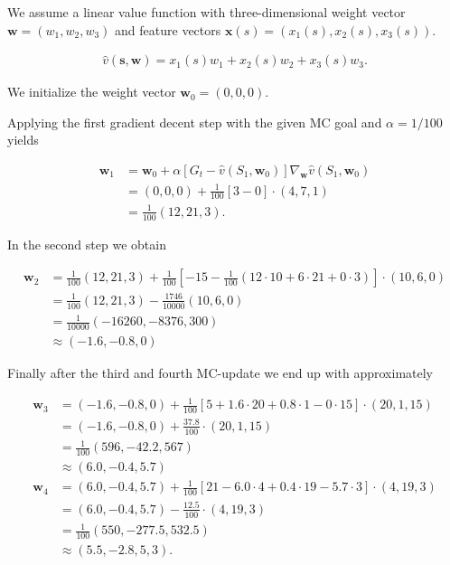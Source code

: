 \begin{solution}

We assume a linear value function with three-dimensional weight vector $\textbf{w} = (w_1,w_2,w_3)$
and feature vectors $\textbf{x}(s) = (x_1(s), x_2(s), x_3(s))$.

\begin{align*}
    \hat{v}(\textbf{s}, \textbf{w}) = x_1(s)w_1 + x_2(s)w_2 + x_3(s)w_3.
\end{align*}

We initialize the weight vector $\textbf{w}_0 = (0,0,0)$.

Applying the first gradient decent step with the given MC goal and $\alpha = 1/100$ yields

\begin{align*}
    \textbf{w}_1 &= \textbf{w}_0 + \alpha 
    \left[G_t - \hat{v}(S_1, \textbf{w}_0)\right]\nabla_{\textbf{w}}\hat{v}(S_1, \textbf{w}_0) \\
    &= (0,0,0) + \frac{1}{100}[3 - 0] \cdot (4,7,1) \\
    &= \frac{1}{100}(12,21,3).
\end{align*}

In the second step we obtain

\begin{align*}
    \textbf{w}_2 &= \frac{1}{100}(12,21,3) + \frac{1}{100}
    \left[-15 - \frac{1}{100}(12 \cdot 10 + 6 \cdot 21 + 0 \cdot 3)\right]
    \cdot (10, 6, 0) \\
    &= \frac{1}{100}(12,21,3) - \frac{1746}{10000}(10, 6, 0) \\
    &= \frac{1}{10000}(-16260,-8376,300) \\
    &\approx (-1.6, -0.8, 0)
\end{align*}

Finally after the third and fourth MC-update we end up with approximately

\begin{align*}
    \textbf{w}_3 &= (-1.6, -0.8, 0) + 
    \frac{1}{100}\left[5 + 1.6\cdot 20 + 0.8 \cdot 1 - 0 \cdot 15\right]
    \cdot (20, 1, 15) \\
    &= (-1.6, -0.8, 0) + \frac{37.8}{100}\cdot (20, 1, 15) \\
    &= \frac{1}{100}(596, -42.2, 567) \\
    &\approx (6.0, -0.4, 5.7) \\
    \textbf{w}_4 &= (6.0, -0.4, 5.7) +
    \frac{1}{100}\left[21 - 6.0 \cdot 4 + 0.4 \cdot 19 - 5.7 \cdot 3\right]
    \cdot (4, 19, 3) \\
    &= (6.0, -0.4, 5.7) - \frac{12.5}{100}\cdot (4, 19, 3) \\
    &= \frac{1}{100}(550, -277.5, 532.5) \\
    &\approx (5.5, -2.8, 5,3).
\end{align*}

\end{solution}

